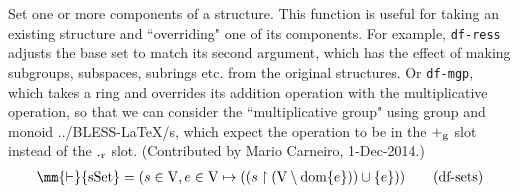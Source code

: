 \begin{metadefinition} Set one or more components of a
structure.  This function is useful for
       taking an existing structure and ``overriding" one of its components.
       For example, {\tt df-ress} adjusts the base set to match its second
       argument, which has the effect of making subgroups, subspaces, subrings
       etc. from the original structures.  Or {\tt df-mgp}, which takes a ring
and
       overrides its addition operation with the multiplicative operation, so
       that we can consider the ``multiplicative group" using group and monoid
       ../BLESS-LaTeX/s, which expect the operation to be in the $+_{\rm g}$ slot
instead of
       the $._{\rm r}$ slot.  (Contributed by Mario Carneiro, 1-Dec-2014.)
\begin{align}
\mm{\vdash} {\rm sSet} = ( s \in {\rm V} , e \in {\rm V} \mapsto ( ( s
    \restriction ( {\rm V} \setminus {\rm dom} \{ e \} ) ) \cup \{ e \} )
    )\label{eq:df-sets}\tag{df-sets}
\end{align}
\end{metadefinition}


